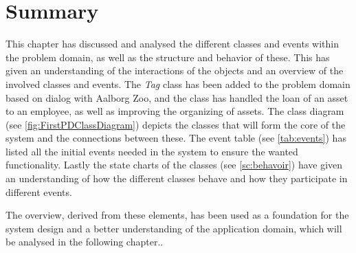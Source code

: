 \section{Summary} \label{ssc:pd_summary}
This chapter has discussed and analysed the different classes and events within the problem domain, as well as the structure and behavior of these. This has given an understanding of the interactions of the objects and an overview of the involved classes and events. The \textit{Tag} class has been added to the problem domain based on dialog with Aalborg Zoo, and the class has handled the loan of an asset to an employee, as well as improving the organizing of assets. The class diagram (see \autoref{fig:FirstPDClassDiagram}) depicts the classes that will form the core of the system and the connections between these. The event table (see \autoref{tab:events}) has listed all the initial events needed in the system to ensure the wanted functionality. Lastly the state charts of the classes (see \autoref{sc:behavoir}) have given an understanding of how the different classes behave and how they participate in different events.
\par

The overview, derived from these elements, has been used as a foundation for the system design and a better understanding of the application domain, which will be analysed in the following chapter..\\